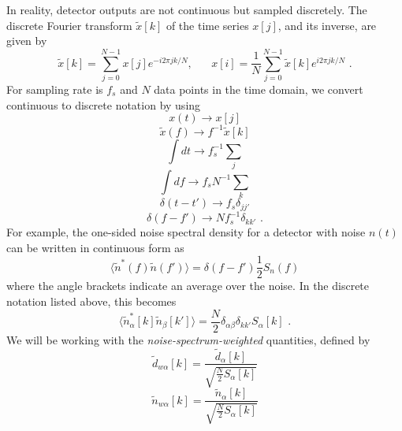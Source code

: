 \documentclass[12pt,twoside,a4paper]{report}
\newcommand{\fs}{\text{ .}}
\begin{document}
In reality, detector outputs are not continuous but sampled discretely. The discrete Fourier transform $\tilde{x}[k]$ of the time series $x[j]$, and its inverse, are given by
\begin{equation}
\tilde{x}[k]=\sum^{N-1}_{j=0} x[j] e^{-i 2\pi jk/N}, \hspace{20pt}x[i]=\frac{1}{N}\sum^{N-1}_{j=0} \tilde{x}[k] e^{i2 \pi jk/N} \fs
\end{equation}
For sampling rate is $f_s$ and $N$ data points in the time domain, we convert continuous to discrete notation by using
\begin{equation}
x(t)\rightarrow x[j]
\end{equation} 
\begin{equation}
\tilde{x}(f)\rightarrow f^{-1} \tilde{x}[k]
\end{equation} 
\begin{equation}
\int dt \rightarrow f_s^{-1}\sum_j
\end{equation} 
\begin{equation}
\int df \rightarrow f_s N^{-1} \sum_k
\end{equation} 
\begin{equation}
\delta(t-t')\rightarrow f_s \delta_{jj'}
\end{equation}
\begin{equation}
\delta(f-f')\rightarrow N f_s^{-1}\delta_{kk'} \fs
\end{equation}  
For example, the one-sided noise spectral density for a detector with noise $n(t)$ can be written in continuous form as
\begin{equation}
\langle  \tilde{n}^* (f) \tilde{n} (f') \rangle = \delta (f-f') \frac{1}{2} S_n (f)
\end{equation}
where the angle brackets indicate an average over the noise. In the discrete notation listed above, this becomes
\begin{equation}
\langle  \tilde{n}^*_\alpha [k] \tilde{n}_\beta [k']  \rangle = \frac{N}{2} \delta _{\alpha \beta} \delta _{k k'} S_\alpha [k] \fs
\end{equation}
We will be working with the \emph{noise-spectrum-weighted} quantities, defined by
\begin{equation}
\tilde{d}_{w\alpha}[k]=\frac{\tilde{d}_\alpha [k]}{\sqrt{\frac{N}{2}S_\alpha [k]}}
\end{equation}
\begin{equation}
\tilde{n}_{w\alpha}[k]=\frac{\tilde{n}_\alpha [k]}{\sqrt{\frac{N}{2}S_\alpha [k]}}
\end{equation}
\end{document}
